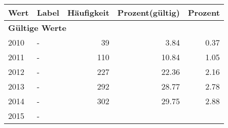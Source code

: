      \begin{longtable}{lXrrr}
     \toprule
     \textbf{Wert} & \textbf{Label} & \textbf{Häufigkeit} & \textbf{Prozent(gültig)} & \textbf{Prozent} \\
     \endhead
     \midrule
     \multicolumn{5}{l}{\textbf{Gültige Werte}}\\

     2010 &
     \multicolumn{1}{X}{ -  } &


       \num{39} &
       \num[round-mode=places,round-precision=2]{3.84} &
         \num[round-mode=places,round-precision=2]{0.37} \\

     2011 &
     \multicolumn{1}{X}{ -  } &


       \num{110} &
       \num[round-mode=places,round-precision=2]{10.84} &
         \num[round-mode=places,round-precision=2]{1.05} \\

     2012 &
     \multicolumn{1}{X}{ -  } &


       \num{227} &
       \num[round-mode=places,round-precision=2]{22.36} &
         \num[round-mode=places,round-precision=2]{2.16} \\

     2013 &
     \multicolumn{1}{X}{ -  } &


       \num{292} &
       \num[round-mode=places,round-precision=2]{28.77} &
         \num[round-mode=places,round-precision=2]{2.78} \\

     2014 &
     \multicolumn{1}{X}{ -  } &


       \num{302} &
       \num[round-mode=places,round-precision=2]{29.75} &
         \num[round-mode=places,round-precision=2]{2.88} \\

     2015 &
     \multicolumn{1}{X}{ -  } &



\end{longtable}
